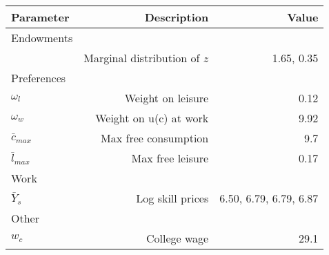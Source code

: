 \begin{tabular}{lrr}
\hline
Parameter & Description  & Value  \\ 
\hline
Endowments &   &   \\ 
 & Marginal distribution of $z$  & 1.65, 0.35  \\ 
Preferences &   &   \\ 
$\omega_{l}$ & Weight on leisure  & 0.12  \\ 
$\omega_{w}$ & Weight on u(c) at work  & 9.92  \\ 
$\bar{c}_{max}$ & Max free consumption  & 9.7  \\ 
$\bar{l}_{max}$ & Max free leisure  & 0.17  \\ 
Work &   &   \\ 
$\bar{Y}_{s}$ & Log skill prices  & 6.50, 6.79, 6.79, 6.87  \\ 
Other &   &   \\ 
$w_{c}$ & College wage  & 29.1  \\ 
\hline
\end{tabular}%
